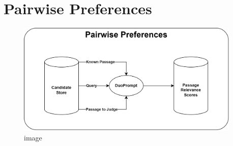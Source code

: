 \section{Pairwise Preferences}\label{pairwise-transfering-relevance-labels-across-datasets}

\begin{figure}[ht]
    \centering
    \includegraphics[width=0.95\textwidth]{./graphics/drawio/pairwise_preferences.png}
    \caption{image}
\end{figure}

